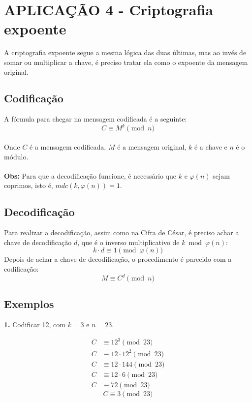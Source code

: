\section{APLICAÇÃO 4 - Criptografia expoente}
A criptografia expoente segue a mesma lógica das duas últimas, mas ao invés de somar ou multiplicar a chave, é preciso tratar ela como o expoente da mensagem original.

\subsection{Codificação}
A fórmula para chegar na mensagem codificada é a seguinte:\\
\[
    C \equiv M^{k} \pmod {n}
\]\\
Onde $C$ é a mensagem codificada, $M$ é a mensagem original, $k$ é a chave e $n$ é o módulo.\\\\
\textbf{Obs:} Para que a decodificação funcione, é necessário que $k$ e $\varphi(n)$ sejam coprimos, isto é, $mdc(k,\varphi(n)) = 1$.

\subsection{Decodificação}
Para realizar a decodificação, assim como na Cifra de César, é preciso achar a chave de decodificação $d$, que é o inverso multiplicativo de $k \bmod \varphi(n)$:
\[
    k \cdot d \equiv 1 \pmod {\varphi(n)}
\]
Depois de achar a chave de decodificação, o procedimento é parecido com a codificação:
\[
    M \equiv C^{d} \pmod {n}
\]

\subsection*{Exemplos}
\textbf{1.} Codificar 12, com $k=3$ e $n=23$.

\begin{align*}
    C & \equiv 12^{3} \pmod {23}          \\
    C & \equiv 12 \cdot 12^{2} \pmod {23} \\
    C & \equiv 12 \cdot 144 \pmod {23}    \\
    C & \equiv 12 \cdot 6 \pmod {23}      \\
    C & \equiv 72 \pmod {23}
\end{align*}
\[
    \boxed{C \equiv 3 \pmod {23}}
\]

\vspace{24pt}